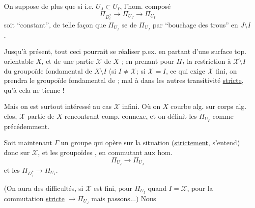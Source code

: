 On suppose de plus que si  i.e. $U_J\subset U_I$,  l'hom. composé
\[
\Pi_{D_i^*}\longrightarrow\Pi_{U_J}\longrightarrow\Pi_{U_I}
\]
soit ``constant'', de telle façon que $\Pi_{U_I}$ se  de $\Pi_{U_J}$ par ``bouchage des trous'' en $J\setminus I$.

Jusqu'à présent, tout ceci pourrait se réaliser p.ex. en partant d'une surface top. orientable  $X$, et de une partie  $\mathcal{X}$ de $X$  ; en prenant pour $\Pi_I$ la restriction à $\mathcal{X}\setminus I$ du groupoïde fondamental de $X\setminus I$ (si $I\ne\mathcal{X}$; si $\mathcal{X}=I$, ce qui exige $\mathcal{X}$ fini, on prendra le groupoïde fondamental de ;  mal à  dans les autres  transitivité \uline{stricte}, qu'à cela ne tienne !

Mais on est surtout intéressé au cas $\mathcal{X}$ infini. Où on  $X$ courbe alg. sur
corps alg. clos, $\mathcal{X}$ partie de $X$ rencontrant  comp. connexe, et on définit les $\Pi_{U_I}$ comme précédemment.

Soit maintenant $\Gamma$ un groupe qui opère sur la situation (\uline{strictement}, s'entend) donc sur  $\mathcal{X}$, et les groupoïdes ,  en commutant aux hom. 
\[
\Pi_{U_I}\longrightarrow\Pi_{U_J}
\]
et les $\Pi_{D_i^*}\longrightarrow\Pi_{U_I}$.

(On aura des difficultés, si $\mathcal{X}$ est fini, pour $\Pi_{U_I}$ quand $I=\mathcal{X}$, pour la commutation \uline{stricte}  $\longrightarrow\Pi_{U_J}$  mais passons...)
Nous    

